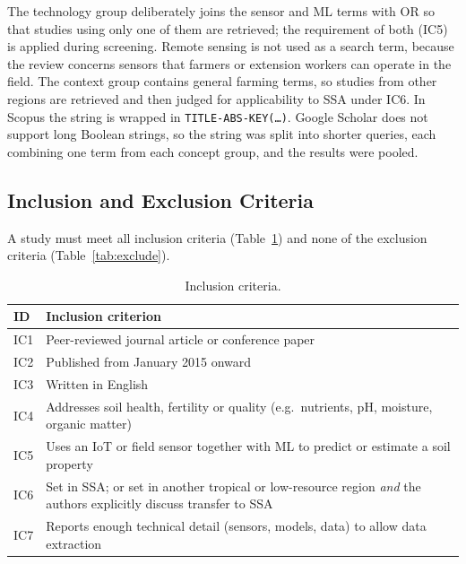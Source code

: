 \documentclass[conference]{IEEEtran}
\begin{document}
The technology group deliberately joins the sensor and ML terms with OR so that
studies using only one of them are retrieved; the requirement of both (IC5) is
applied during screening. Remote sensing is not used as a search term, because
the review concerns sensors that farmers or extension workers can operate in the
field. The context group contains general farming terms, so studies from other
regions are retrieved and then judged for applicability to SSA under IC6. In
Scopus the string is wrapped in \texttt{TITLE-ABS-KEY(\ldots)}. Google Scholar
does not support long Boolean strings, so the string was split into shorter
queries, each combining one term from each concept group, and the results were
pooled.

\subsection{Inclusion and Exclusion Criteria}
A study must meet all inclusion criteria (Table~\ref{tab:include}) and none of
the exclusion criteria (Table~\ref{tab:exclude}).

\begin{table}[t]
\caption{Inclusion criteria.}
\label{tab:include}
\centering
\footnotesize
\begin{tabular}{@{}p{0.75cm}p{6.9cm}@{}}
\toprule
ID & Inclusion criterion\\
\midrule
IC1 & Peer-reviewed journal article or conference paper\\
IC2 & Published from January 2015 onward\\
IC3 & Written in English\\
IC4 & Addresses soil health, fertility or quality (e.g.\ nutrients, pH, moisture, organic matter)\\
IC5 & Uses an IoT or field sensor together with ML to predict or estimate a soil property\\
IC6 & Set in SSA; or set in another tropical or low-resource region \emph{and} the authors explicitly discuss transfer to SSA\\
IC7 & Reports enough technical detail (sensors, models, data) to allow data extraction\\
\bottomrule
\end{tabular}
\end{table}
\end{document}
